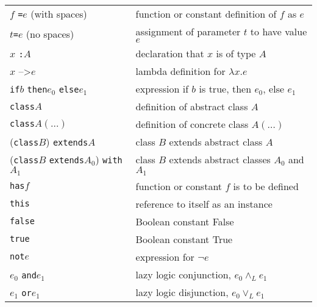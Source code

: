 \documentclass[12pt,a4paper]{book}
\newcommand{\srccode}[1]{\texttt{{#1}}}
\newcommand{\reservedWord}[1]{{\color{blue}\srccode{#1}}\xspace}
\newcommand{\sdef}{\srccode{=}\xspace}
\newcommand{\scolon}{\srccode{:}}
\newcommand{\slambda}{{\tiny--\textgreater}\xspace}
\newcommand{\sif}{\reservedWord{if}}
\newcommand{\sthen}{\reservedWord{then}}
\newcommand{\selse}{\reservedWord{else}}
\newcommand{\sclass}{\reservedWord{class}}
\newcommand{\shas}{\reservedWord{has}}
\newcommand{\sextends}{\reservedWord{extends}}
\newcommand{\swith}{\reservedWord{with}}
\newcommand{\sthis}{\reservedWord{this}}
\newcommand{\sfalse}{\reservedWord{false}}
\newcommand{\strue}{\reservedWord{true}}
\newcommand{\snot}{\reservedWord{not}}
\newcommand{\sand}{\reservedWord{and}}
\newcommand{\sor}{\reservedWord{or}}
\begin{document}
    \begin{tabular}{|l|l|}
        \hline
        $f$ \sdef $e$ (with spaces)                    & function or constant definition of $f$ as $e$          \\
        $t$\srccode{=}$e$ (no spaces)                  & assignment of parameter $t$ to have value $e$          \\
        $x$ \scolon $A$                                & declaration that $x$ is of type $A$                    \\
        $x$ \slambda $e$                               & lambda definition for $\lambda x . e$                  \\
        \hline
        \sif $b$ \sthen $e_{0}$ \selse $e_{1}$         & expression if $b$ is true, then $e_{0}$, else $e_{1}$  \\
        \hline
        \sclass $A$                                    & definition of abstract class $A$                       \\
        \sclass $A(\ldots)$                            & definition of concrete class $A(\ldots )$              \\
        (\sclass $B$) \sextends $A$                    & class $B$ extends abstract class $A$                   \\
        (\sclass $B$ \sextends $A_{0}$) \swith $A_{1}$ & class $B$ extends abstract classes $A_{0}$ and $A_{1}$ \\
        \shas $f$                                      & function or constant $f$ is to be defined              \\
        \sthis                                         & reference to itself as an instance                     \\
        \hline
        \sfalse                                        & Boolean constant False                                 \\
        \strue                                         & Boolean constant True                                  \\
        \snot $e$                                      & expression for $\lnot e$                               \\
        $e_{0}$ \sand $e_{1}$                          & lazy logic conjunction, $e_{0} \land _{L} e_{1}$       \\
        $e_{1}$ \sor $e_{1}$                           & lazy logic disjunction, $e_{0} \lor _{L} e_{1}$        \\

\end{tabular}
\end{document}
